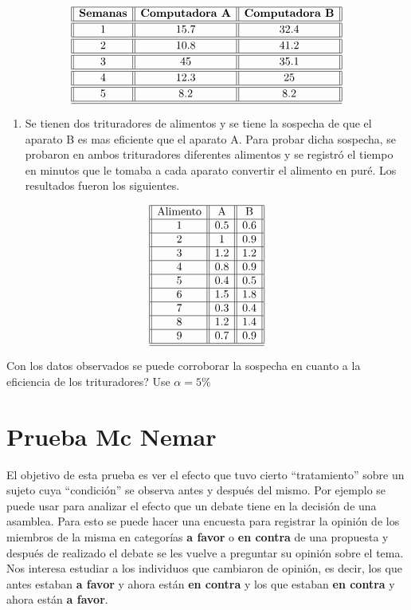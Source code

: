 \documentclass[
  a4paper,
  oneside,
  openany]{book}
\providecommand{\tightlist}{%
  \setlength{\itemsep}{0pt}\setlength{\parskip}{0pt}}
\begin{document}
\[
\begin{array}{||c| |c| |c||} 
\hline 
\textbf{Semanas} & \textbf{Computadora A} & \textbf{Computadora B} \\ 
\hline
\hline
1 &15.7& 32.4 \\
\hline
\hline
2& 10.8 &41.2 \\
\hline
\hline
3 &45   & 35.1 \\
\hline
\hline
4 &12.3& 25 \\
\hline
\hline
5 & 8.2&8.2 \\
\hline
\hline
\end{array}
\]

\begin{enumerate}
\def\labelenumi{\arabic{enumi}.}
\setcounter{enumi}{2}
\tightlist
\item
  Se tienen dos trituradores de alimentos y se tiene la sospecha de que el aparato B es mas eficiente que el aparato A. Para probar dicha sospecha, se probaron en ambos trituradores diferentes alimentos y se registró el tiempo en minutos que le tomaba a cada aparato convertir el alimento en puré. Los resultados fueron los siguientes.
\end{enumerate}

\[
\begin{array}{||c| |c| |c| |c|} 
\hline 
\mbox{Alimento} & \mbox{A} & \mbox{B}\\
 \hline
1&0.5&0.6\\
 \hline
2&1&0.9\\
 \hline
3&1.2&1.2\\
 \hline
4&0.8&0.9\\
 \hline
5&0.4&0.5\\
 \hline
6&1.5&1.8\\
 \hline
7&0.3&0.4\\
 \hline
8&1.2&1.4\\
 \hline
9&0.7&0.9\\
\hline
\hline
\end{array}
\]

Con los datos observados se puede corroborar la sospecha en cuanto a la eficiencia de los trituradores? Use \(\alpha=5\%\)

\hypertarget{prueba-mc-nemar}{%
\chapter{Prueba Mc Nemar}\label{prueba-mc-nemar}}

El objetivo de esta prueba es ver el efecto que tuvo cierto ``tratamiento'' sobre un sujeto cuya ``condición'' se observa antes y después del mismo.
Por ejemplo se puede usar para analizar el efecto que un debate tiene en la decisión de una asamblea. Para esto se puede hacer una encuesta para registrar la opinión de los miembros de la misma en categorías \textbf{a favor} o \textbf{en contra} de una propuesta y después de realizado el debate se les vuelve a preguntar su opinión sobre el tema.
Nos interesa estudiar a los individuos que cambiaron de opinión, es decir, los que antes estaban \textbf{a favor} y ahora están \textbf{en contra} y los que estaban \textbf{en contra} y ahora están \textbf{a favor}.
\end{document}
